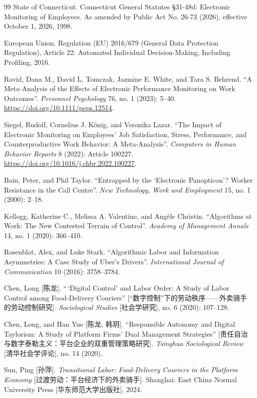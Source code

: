 \documentclass[10pt]{article}
\begin{document}
\begin{thebibliography}{99}
 State of Connecticut. Connecticut General Statutes \S 31-48d: Electronic Monitoring of Employees. As amended by Public Act No. 26-73 (2026), effective October 1, 2026, 1998.

 European Union. Regulation (EU) 2016/679 (General Data Protection Regulation), Article 22: Automated Individual Decision-Making, Including Profiling, 2016.

 Ravid, Dana M., David L. Tomczak, Jazmine E. White, and Tara S. Behrend. ``A Meta-Analysis of the Effects of Electronic Performance Monitoring on Work Outcomes''. \emph{Personnel Psychology} 76, no. 1 (2023): 5--40. \url{https://doi.org/10.1111/peps.12514}.

 Siegel, Rudolf, Cornelius J. K\"onig, and Veronika Lazar. ``The Impact of Electronic Monitoring on Employees' Job Satisfaction, Stress, Performance, and Counterproductive Work Behavior: A Meta-Analysis''. \emph{Computers in Human Behavior Reports} 8 (2022): Article 100227. \url{https://doi.org/10.1016/j.chbr.2022.100227}.

 Bain, Peter, and Phil Taylor. ``Entrapped by the `Electronic Panopticon'? Worker Resistance in the Call Centre''. \emph{New Technology, Work and Employment} 15, no. 1 (2000): 2--18.

 Kellogg, Katherine C., Melissa A. Valentine, and Ang\`ele Christin. ``Algorithms at Work: The New Contested Terrain of Control''. \emph{Academy of Management Annals} 14, no. 1 (2020): 366--410.

 Rosenblat, Alex, and Luke Stark. ``Algorithmic Labor and Information Asymmetries: A Case Study of Uber's Drivers''. \emph{International Journal of Communication} 10 (2016): 3758--3784.

 Chen, Long [{\cjkfont 陈龙}]. ``\,`Digital Control' and Labor Order: A Study of Labor Control among Food-Delivery Couriers'' [{\cjkfont “数字控制”下的劳动秩序——外卖骑手的劳动控制研究}]. \emph{Sociological Studies} [{\cjkfont 社会学研究}], no. 6 (2020): 107--128.

 Chen, Long, and Han Yue [{\cjkfont 陈龙, 韩玥}]. ``Responsible Autonomy and Digital Taylorism: A Study of Platform Firms' Dual Management Strategies'' [{\cjkfont 责任自治与数字泰勒主义：平台企业的双重管理策略研究}]. \emph{Tsinghua Sociological Review} [{\cjkfont 清华社会学评论}], no. 14 (2020).

 Sun, Ping [{\cjkfont 孙萍}]. \emph{Transitional Labor: Food-Delivery Couriers in the Platform Economy} [{\cjkfont 过渡劳动：平台经济下的外卖骑手}]. Shanghai: East China Normal University Press [{\cjkfont 华东师范大学出版社}], 2024.

\end{thebibliography}
\end{document}
